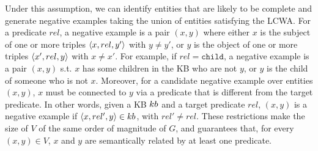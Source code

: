 Under this assumption, we can identify entities that are likely to be complete and generate negative examples taking the union of entities satisfying the LCWA. For a predicate $rel$, a negative example is a pair $(x,y)$ where either $x$ is the subject of one or more triples $\langle x,rel,y'\rangle$ with $y \neq y'$, or $y$ is the object of one or more triples $\langle x',rel,y\rangle$ with $x \neq x'$. 
For example, if $rel=\texttt{child}$, a negative example is a pair $(x,y)$ s.t. $x$ has some children in the KB who are not $y$, or $y$ is the child of someone who is not $x$. %
Moreover, for a candidate negative example over entities $(x,y)$, $x$ must be connected to $y$ via a predicate that is different from the target predicate. In other words, given a KB ${\sc kb}$ and a target predicate $rel$, $(x,y)$ is a negative example if $\langle x,rel',y\rangle \in {\sc kb}$, with $rel' \neq rel$. 
These restrictions make the size of $V$ of the same order of magnitude of $G$, %
and guarantees that, for every $(x,y) \in V$, $x$ and $y$ are semantically related by at least one predicate.



